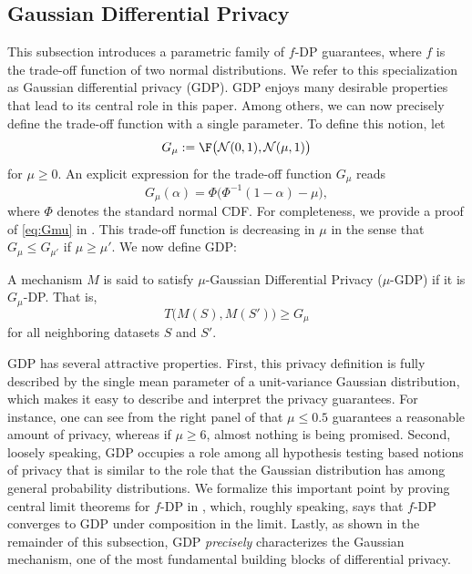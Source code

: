 \subsection{Gaussian Differential Privacy} %
\label{sub:gaussian_differential_privacy}



This subsection introduces a parametric family of $f$-DP guarantees, where $f$ is the trade-off function of two normal distributions. We refer to this specialization as Gaussian differential privacy (GDP). GDP enjoys many desirable properties that lead to its central role in this paper. Among others, we can now precisely define the trade-off function with a single parameter. To define this notion, let
\[
G_\mu:=\F\big(\N(0,1), \N(\mu,1)\big)
\]
for $\mu \ge 0$. An explicit expression for the trade-off function $G_\mu$ reads
\begin{equation}\label{eq:Gmu}
	G_\mu(\alpha) = \Phi\big(\Phi^{-1}(1-\alpha)-\mu\big),
\end{equation}
where $\Phi$ denotes the standard normal CDF. For completeness, we provide a proof of \eqref{eq:Gmu} in . This trade-off function is decreasing in $\mu$ in the sense that $G_\mu \leqslant G_{\mu'}$ if $\mu \ge \mu'$. We now define GDP:
\begin{definition} \label{def:GDP}
A mechanism $M$ is said to satisfy $\mu$-Gaussian Differential Privacy ($\mu$-GDP) if it is $G_\mu$-DP. That is,
\[
T\big(M(S),M(S')\big) \ge G_\mu
\]
for all neighboring datasets $S$ and $S'$.
\end{definition}
GDP has several attractive properties. First, this privacy definition is fully described by the single mean parameter of a unit-variance Gaussian distribution, which makes it easy to describe and interpret the privacy guarantees. For instance, one can see from the right panel of  that $\mu \le 0.5$ guarantees a reasonable amount of privacy, whereas if $\mu \geqslant 6$, almost nothing is being promised. Second, loosely speaking, GDP occupies a role among all hypothesis testing based notions of privacy that is similar to the role that the Gaussian distribution has among general probability distributions. We formalize this important point by proving central limit theorems for $f$-DP in , which, roughly speaking, says that $f$-DP converges to GDP under composition in the limit. Lastly, as shown in the remainder of this subsection, GDP \emph{precisely} characterizes the Gaussian mechanism, one of the most fundamental building blocks of differential privacy.


